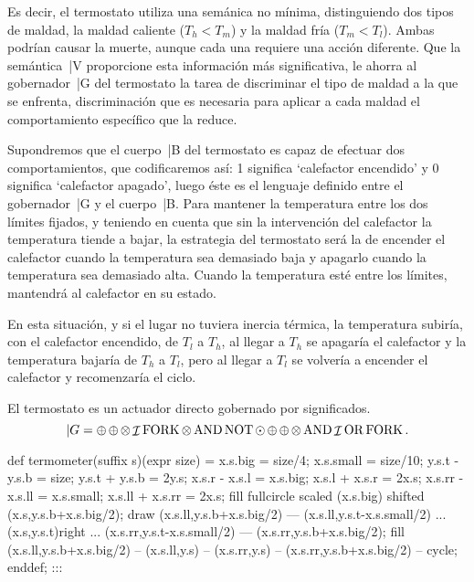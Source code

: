 Es decir, el termostato utiliza una semánica no mínima, distinguiendo
dos tipos de maldad, la maldad caliente ($T_h < T_m$) y la maldad fría
($T_m < T_l$).  Ambas podrían causar la muerte, aunque cada una requiere
una acción diferente.  Que la semántica~|V proporcione esta
información más significativa, le ahorra al gobernador~|G del
termostato la tarea de discriminar el tipo de maldad a la que se enfrenta,
discriminación que es necesaria para aplicar a cada maldad el
comportamiento específico que la reduce.

Supondremos que el cuerpo~|B del termostato es capaz de efectuar dos
comportamientos, que codificaremos así:  1 significa `calefactor encendido'
y 0 significa `calefactor apagado', luego éste es el lenguaje definido entre
el gobernador~|G y el cuerpo~|B.  Para mantener la temperatura entre los dos
límites fijados, y teniendo en cuenta que sin la intervención del calefactor
la temperatura tiende a bajar, la estrategia del termostato será la de
encender el calefactor cuando la temperatura sea demasiado baja y apagarlo
cuando la temperatura sea demasiado alta.  Cuando la temperatura esté entre
los límites, mantendrá al calefactor en su estado.

En esta situación, y si el lugar no tuviera inercia térmica, la
temperatura subiría, con el calefactor encendido, de $T_l$ a $T_h$, al
llegar a $T_h$ se apagaría el calefactor y la temperatura bajaría de
$T_h$ a $T_l$, pero al llegar a $T_l$ se volvería a encender el
calefactor y recomenzaría el ciclo.

El termostato es un actuador directo gobernado por significados.
 $$|G = \srl\srl \prl\ID\FORK \prl\AND\NOT \fdb \srl\srl
  \prl\AND\ID \OR \FORK.$$

\MTline{}\MTcode
 def termometer(suffix s)(expr size) =
  x.s.big = size/4; x.s.small = size/10;
  y.s.t - y.s.b = size; y.s.t + y.s.b = 2y.s;
  x.s.r - x.s.l = x.s.big; x.s.l + x.s.r = 2x.s;
  x.s.rr - x.s.ll = x.s.small; x.s.ll + x.s.rr = 2x.s;
  fill fullcircle scaled (x.s.big) shifted (x.s,y.s.b+x.s.big/2);
  draw (x.s.ll,y.s.b+x.s.big/2) --- (x.s.ll,y.s.t-x.s.small/2) ...
       (x.s,y.s.t){right} ... (x.s.rr,y.s.t-x.s.small/2) ---
       (x.s.rr,y.s.b+x.s.big/2);
   fill (x.s.ll,y.s.b+x.s.big/2) -- (x.s.ll,y.s) --
        (x.s.rr,y.s) -- (x.s.rr,y.s.b+x.s.big/2) -- cycle;
 enddef;
:::

